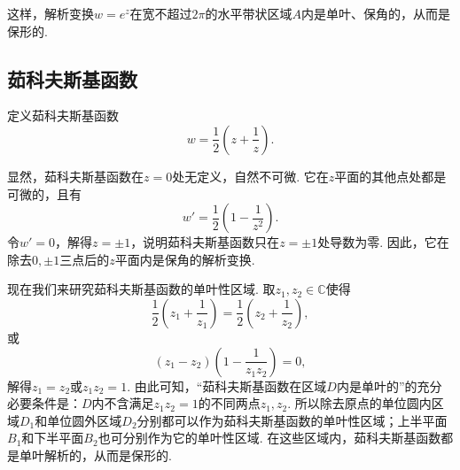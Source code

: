 这样，解析变换\(w = e^z\)在宽不超过\(2\pi\)的水平带状区域\(A\)内是单叶、保角的，从而是保形的.

\subsection{茹科夫斯基函数}
\begin{definition}
定义茹科夫斯基函数\[
w = \frac{1}{2} \left(z + \frac{1}{z}\right).
\]
\end{definition}

显然，茹科夫斯基函数在\(z=0\)处无定义，自然不可微.
它在\(z\)平面的其他点处都是可微的，且有\[
w' = \frac{1}{2} \left(1 - \frac{1}{z^2}\right).
\]令\(w' = 0\)，解得\(z=\pm1\)，说明茹科夫斯基函数只在\(z=\pm1\)处导数为零.
因此，它在除去\(0,\pm1\)三点后的\(z\)平面内是保角的解析变换.

现在我们来研究茹科夫斯基函数的单叶性区域.
取\(z_1,z_2\in\mathbb{C}\)使得\[
\frac{1}{2} \left(z_1 + \frac{1}{z_1}\right)
= \frac{1}{2} \left(z_2 + \frac{1}{z_2}\right),
\]或\[
(z_1-z_2)\left(1-\frac{1}{z_1 z_2}\right) = 0,
\]解得\(z_1 = z_2\)或\(z_1 z_2 = 1\).
由此可知，“茹科夫斯基函数在区域\(D\)内是单叶的”的充分必要条件是：\(D\)内不含满足\(z_1 z_2 = 1\)的不同两点\(z_1,z_2\).
所以除去原点的单位圆内区域\(D_1\)和单位圆外区域\(D_2\)分别都可以作为茹科夫斯基函数的单叶性区域；上半平面\(B_1\)和下半平面\(B_2\)也可分别作为它的单叶性区域.
在这些区域内，茹科夫斯基函数都是单叶解析的，从而是保形的.

